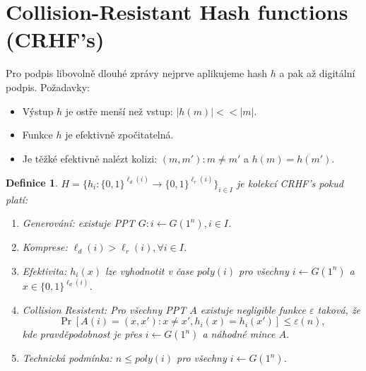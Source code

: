 \documentclass{article}
\newtheorem{definition}{Definice}
\begin{document}

\section{Collision-Resistant Hash functions (CRHF's)}
Pro podpis libovolně dlouhé zprávy nejprve aplikujeme hash $h$ a pak až digitální podpis.
Požadavky:
\begin{itemize}
\item Výstup $h$ je ostře menší než vstup: $|h(m)| << |m|$.
\item Funkce $h$ je efektivně zpočitatelná.
\item Je těžké efektivně nalézt kolizi: $(m,m'): m\neq m'$ a $h(m) = h(m')$.
\end{itemize}

\begin{definition}
$H = \bigl\{h_i: \{0,1\}^{\ell_d(i)} \to \{0,1\}^{\ell_r(i)} \bigr\}_{i \in I}$
je \emph{kolekcí CRHF's} pokud platí:
\begin{enumerate}
\item Generování: existuje PPT $G: i \leftarrow G(1^n), i \in I$.
\item Komprese: $\ell_d(i) > \ell_r(i), \forall i \in I$.
\item Efektivita: $h_i(x)$ lze vyhodnotit v čase $\textit{poly}(i)$ pro všechny $i \leftarrow G(1^n)$ a $x \in \{0,1\}^{\ell_d(i)}$.
\item Collision Resistent: Pro všechny PPT $A$ existuje negligible funkce $\varepsilon$ taková, že
\[
\Pr[A(i) = (x,x'): x \neq x', h_i(x) = h_i(x')] \leq \varepsilon(n),
\]
kde pravděpodobnost je přes $i \leftarrow G(1^n)$ a náhodné mince $A$.
\item Technická podmínka: $n \leq \textit{poly}(i)$ pro všechny $i \leftarrow G(1^n)$.
\end{enumerate}
\end{definition}
\end{document}

